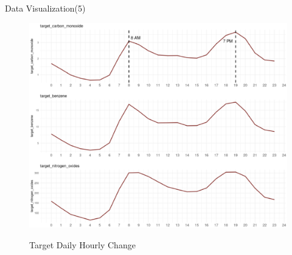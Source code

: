 \documentclass[
 size=14pt,
 paper=smartboard,  %
 mode=present, 		%
 display=slides, 	%
 style=tuliplab,  	%
 pauseslide,
 fleqn,leqno]{powerdot}
\begin{document}
\begin{slide}[toc=,bm=]{Data Visualization(5)}
	
	\begin{figure}
		\centering
        \includegraphics[scale=0.3]{figures//p5.eps}\\
		\caption{Target Daily Hourly Change}\label{fig:Target Daily Hourly Change}
	\end{figure}
	
\end{slide}
\end{document}
